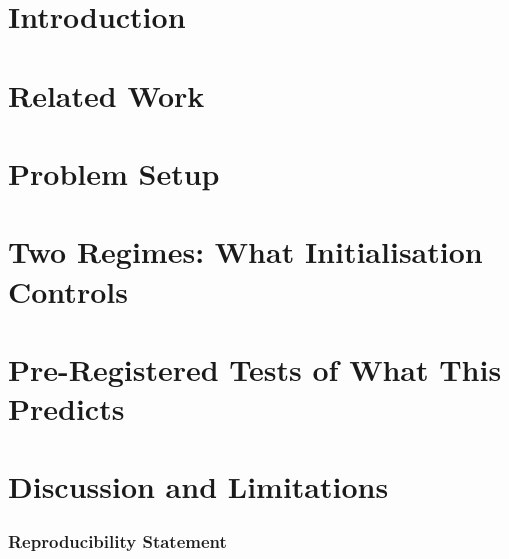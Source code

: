 \section{Introduction}\label{sec:intro}


\section{Related Work}\label{sec:related_work}


\section{Problem Setup}\label{sec:setup}



\section{Two Regimes: What Initialisation Controls}\label{sec:regimes}


\section{Pre-Registered Tests of What This Predicts}\label{sec:methods}


\section{Discussion and Limitations}\label{sec:discussion}\label{sec:future}


\subsubsection*{Reproducibility Statement}


\ifdefined\TopmatterAlreadySet
\begin{acks}

\end{acks}
\fi

\ifdefined\TopmatterAlreadySet
\printbibliography
\else

\fi

